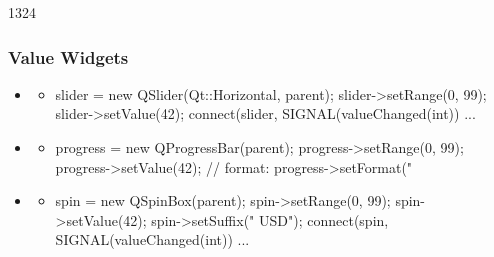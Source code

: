 \begin{slide}[fragile]{1324}
  \frametitle{Value Widgets}
 \begin{itemize}
  \item \textbf{}
    \begin{itemize}
    \item[]
      \begin{cpp}
slider = new QSlider(Qt::Horizontal, parent);
slider->setRange(0, 99);
slider->setValue(42);
connect(slider, SIGNAL(valueChanged(int)) ...
      \end{cpp}
    \end{itemize}
  \item \textbf{}
    \begin{itemize}
    \item[]
      \begin{cpp}
progress = new QProgressBar(parent);
progress->setRange(0, 99);
progress->setValue(42);
// format: %
progress->setFormat("%
    \end{cpp}
   \end{itemize}
 \item \textbf{}
   \begin{itemize}
    \item[]
      \begin{cpp}
spin = new QSpinBox(parent);
spin->setRange(0, 99);
spin->setValue(42);
spin->setSuffix(" USD");
connect(spin, SIGNAL(valueChanged(int)) ...
      \end{cpp}
  \end{itemize}
 \end{itemize}
\end{slide}


